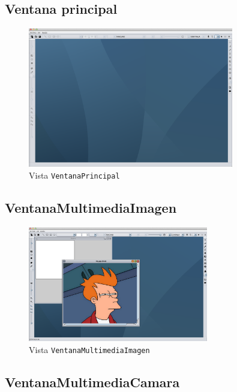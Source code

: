\subsection{Ventana principal}
\vskip0.3cm
\begin{figure}[H]
 \centering
  \includegraphics[width=0.8\textwidth]{graficos/ventanaPrincipal.png}
 \caption{Vista \texttt{VentanaPrincipal}}
 \label{diseño}
 \end{figure}
 
\subsection{VentanaMultimediaImagen}
\vskip0.3cm
\begin{figure}[H]
 \centering
  \includegraphics[width=0.7\textwidth]{graficos/ventanaImagen.jpg}
 \caption{Vista \texttt{VentanaMultimediaImagen}}
 \label{diseño}
 \end{figure}

\subsection{VentanaMultimediaCamara}
 
